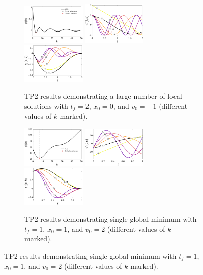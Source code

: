 \begin{figure}
\centering

\begin{subfigure}[b]{1\textwidth}
       \centering
        \includegraphics[width=0.333\textwidth]{../ch3/figures/T1_1_PSI}%
        \includegraphics[width=0.333\textwidth]{../ch3/figures/T1_1_U}%
        \includegraphics[width=0.333\textwidth]{../ch3/figures/T1_1_X}%
        \caption{TP2 results demonstrating a large number of
local solutions with $t_f = 2$, $x_0 = 0$, and $v_0 = -1$ (different values of $k$ marked).\label{fig:ch3:T1_1}}
\end{subfigure}%

\begin{subfigure}[b]{1\textwidth}
  \centering
  \includegraphics[width=0.333\textwidth]{../ch3/figures/T1_2_PSI}%
  \includegraphics[width=0.333\textwidth]{../ch3/figures/T1_2_U}%
  \includegraphics[width=0.333\textwidth]{../ch3/figures/T1_2_X}%
  \caption{TP2 results demonstrating single global minimum with $t_f = 1$, $x_0 = 1$, and $v_0 = 2$ (different values of $k$ marked).\label{fig:ch3:T1_2}}
\end{subfigure}%


\end{figure}
